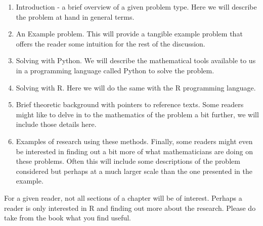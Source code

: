 \begin{enumerate}
\item
  Introduction - a brief overview of a given problem type. Here we will
  describe the problem at hand in general terms.
\item
  An Example problem. This will provide a tangible example problem that
  offers the reader some intuition for the rest of the discussion.
\item
  Solving with Python. We will describe the mathematical tools available
  to us in a programming language called Python to solve the problem.
\item
  Solving with R. Here we will do the same with the R programming
  language.
\item
  Brief theoretic background with pointers to reference texts. Some
  readers might like to delve in to the mathematics of the problem a bit
  further, we will include those details here.
\item
  Examples of research using these methods. Finally, some readers might
  even be interested in finding out a bit more of what mathematicians
  are doing on these problems. Often this will include some descriptions
  of the problem considered but perhaps at a much larger scale than the
  one presented in the example.
\end{enumerate}

For a given reader, not all sections of a chapter will be of interest.
Perhaps a reader is only interested in R and finding out more about the
research. Please do take from the book what you find useful.

